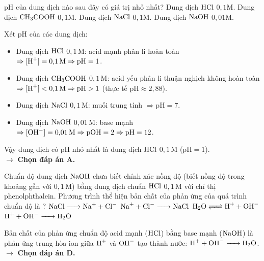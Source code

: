 \documentclass[11pt,a4paper]{article}
\begin{document}
\begin{ex}%
pH của dung dịch nào sau đây có giá trị nhỏ nhất?
\choice
{\True Dung dịch $\ce{HCl}$ $0{,}1\text{M}$.}
{Dung dịch $\ce{CH3COOH}$ $0{,}1\text{M}$.}
{Dung dịch $\ce{NaCl}$ $0{,}1\text{M}$.}
{Dung dịch $\ce{NaOH}$ $0{,}01\text{M}$.}
\begin{loigiai}
Xét pH của các dung dịch:
\begin{itemize}[leftmargin=0.8cm]
\item Dung dịch $\ce{HCl}$ $0{,}1\,\text{M}$: acid mạnh phân li hoàn toàn $\Rightarrow [\ce{H+}] = 0{,}1\,\text{M} \Rightarrow \text{pH} = 1$.
\item Dung dịch $\ce{CH3COOH}$ $0{,}1\,\text{M}$: acid yếu phân li thuận nghịch không hoàn toàn $\Rightarrow [\ce{H+}] < 0{,}1\,\text{M} \Rightarrow \text{pH} > 1$ (thực tế $\text{pH} \approx 2{,}88$).
\item Dung dịch $\ce{NaCl}$ $0{,}1\,\text{M}$: muối trung tính $\Rightarrow \text{pH} = 7$.
\item Dung dịch $\ce{NaOH}$ $0{,}01\,\text{M}$: base mạnh $\Rightarrow [\ce{OH-}] = 0{,}01\,\text{M} \Rightarrow \text{pOH} = 2 \Rightarrow \text{pH} = 12$.
\end{itemize}
Vậy dung dịch có pH nhỏ nhất là dung dịch $\ce{HCl}$ $0{,}1\,\text{M}$ ($\text{pH} = 1$).\\
$\rightarrow$ \textbf{Chọn đáp án A.}
\end{loigiai}
\end{ex}

\begin{ex}%
Chuẩn độ dung dịch $\ce{NaOH}$ chưa biết chính xác nồng độ (biết nồng độ trong khoảng gần với $0{,}1\,\text{M}$) bằng dung dịch chuẩn $\ce{HCl}$ $0{,}1\,\text{M}$ với chỉ thị phenolphthalein. Phương trình thể hiện bản chất của phản ứng của quá trình chuẩn độ là ?
\choice
{$\ce{NaCl -> Na+ + Cl-}$}
{$\ce{Na+ + Cl- -> NaCl}$}
{$\ce{H2O <=> H+ + OH-}$}
{\True $\ce{H+ + OH- -> H2O}$}
\begin{loigiai}
Bản chất của phản ứng chuẩn độ acid mạnh ($\ce{HCl}$) bằng base mạnh ($\ce{NaOH}$) là phản ứng trung hòa ion giữa $\ce{H+}$ và $\ce{OH-}$ tạo thành nước: $\ce{H+ + OH- -> H2O}$.\\
$\rightarrow$ \textbf{Chọn đáp án D.}
\end{loigiai}
\end{ex}
\end{document}
